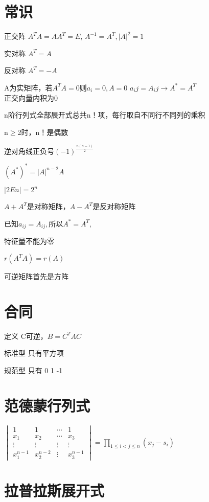 \documentclass[UTF8]{ctexart}
\begin{document}
\section{常识}

正交阵 $A^{T}A=AA^{T}=E$, $A^{-1}=A^{T} , |A|^2 =1$


实对称 $A^{T}=A$

反对称 $A^{T}=-A$

A为实矩阵，若$A^{T}A=0\text{则}$$a_{i}=0,A=0$
$a_ij=A_ij \rightarrow A^*=A^T$ \\

正交向量内积为0

n阶行列式全部展开式总共n！项，每行取自不同行不同列的乘积

n$\geq$2时，n！是偶数

逆对角线正负号$(-1)^{\frac{n(n-1)}{2}}$

$(A^{*})^{*}=|A|^{n-2}A$


$|2En|=2^n$


$A+A^{T}$是对称矩阵，$A-A^{T}$是反对称矩阵

已知$a_{ij}=A_{ij} , \mbox{所以} A^* =A^T ,$

特征量不能为零

$r(A^TA)=r(A)$

可逆矩阵首先是方阵


\section{合同}

定义 C可逆，$B=C^{T}AC$

标准型 只有平方项

规范型 只有 0 1 -1

\section{范德蒙行列式}

$\begin{vmatrix}1 & 1 & \cdots & 1\\
x_{1} & x_{2} & \cdots & x_{3}\\
\vdots & \vdots & \vdots & \vdots\\
x_{1}^{n-1} & x_{2}^{n-2} & \vdots & x_{3}^{n-1}
\end{vmatrix}=\prod_{1\leq i<j\leq n}(x_{j}-s_{i})$

\section{拉普拉斯展开式}
\end{document}

